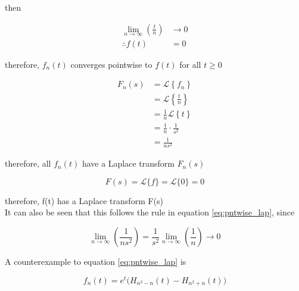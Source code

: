 \documentclass[a4paper,10pt,reqno]{amsart}
\numberwithin{equation}{section}
\newcommand{\lap}{\mathscr{L}}
\begin{document}
then

\begin{subequations}
     \begin{align}
         \lim_{n \to \infty} \left(\frac{t}{n}\right) &\to 0 \\
         \therefore f(t) &= 0
     \end{align}
\end{subequations}
\vspace{1pt}

therefore, $f_n(t)$ converges pointwise to $f(t)$ for all $t\geq0$

\begin{subequations}
     \begin{align}
         F_n(s) &= \lap\left\{f_n\right\} \\
         &= \lap\left\{\frac{t}{n}\right\} \\
         &= \frac{1}{n} \lap\left\{t\right\} \\
         &= \frac{1}{n} \cdot \frac{1}{s^2} \\
         &= \frac{1}{ns^2}
    \end{align}
\end{subequations}
\vspace{1pt}

therefore, all $f_n(t)$ have a Laplace transform $F_n(s)$

\begin{equation}\label{eq:F}
     F(s) = \lap\{f\} = \lap\{0\} = 0
\end{equation}
\vspace{1pt}

therefore, f(t) has a Laplace transform F(s) \\

It can also be seen that this follows the rule in equation \ref{eq:pntwise_lap}, since

\begin{equation}
     \lim_{n \to \infty} \left(\frac{1}{ns^2}\right) = \frac{1}{s^2} \lim_{n \to \infty} \left(\frac{1}{n}\right) \to 0
\end{equation}
\vspace{1pt}

A counterexample to equation \ref{eq:pntwise_lap} is

\begin{equation}\label{eq:fn}
     f_n(t) = e^t\big(H_{n^2 - n}(t) - H_{n^2 + n}(t)\big)
\end{equation}
\vspace{1pt}
\end{document}
